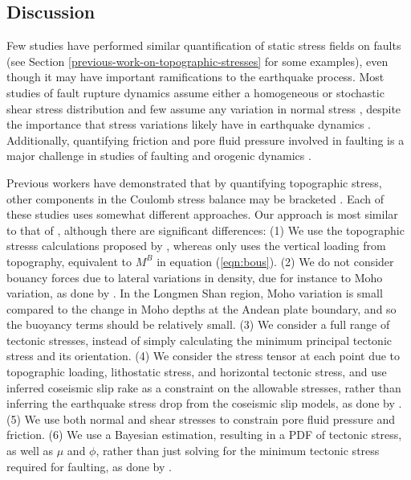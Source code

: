 \documentclass[twocolumn,jgrga]{AGUTeX}
\begin{document}
\begin{article}
\section{Discussion}\label{discussion}

Few studies have performed similar quantification of static stress
fields on faults (see Section
\ref{previous-work-on-topographic-stresses} for some examples), even
though it may have important ramifications to the earthquake process.
Most studies of fault rupture dynamics
assume either a homogeneous or stochastic shear stress distribution
\citep[e.g.,][]{oglesbyday2002} and few assume any variation in normal
stress \citep[e.g.,][]{aagaard2001}, despite the importance that stress
variations likely have in earthquake dynamics \citep[e.g.,][]{day1982,
olsen1997}. Additionally, quantifying friction and pore fluid
pressure involved in faulting is a major challenge in studies of
faulting and orogenic dynamics \citep[e.g.,][]{meissner1982,
oglesbyday2002}.

Previous workers have demonstrated that by quantifying topographic
stress, other components in the Coulomb stress balance may be bracketed
\citep[e.g.,][]{cattin1997, lamb2006, luttrell2011}. Each of these studies
uses somewhat different approaches. Our approach is most similar to that
of \citet{luttrell2011}, although there are significant
differences: (1) We use the topographic stresss calculations proposed by
\citet{liuzoback1992}, whereas 
\citet{luttrell2011} only uses the vertical loading from topography,
equivalent to $M^B$ in equation (\ref{eqn:bous}). (2) We do not consider
bouancy forces due to lateral variations in density, due for instance to
Moho variation, as done by \citet{luttrell2011}. In the
Longmen Shan region, Moho variation is small compared to the change in
Moho depths at the Andean plate boundary, and so the buoyancy terms
should be relatively small. (3) We consider a full range of tectonic
stresses, instead of simply calculating the minimum principal tectonic
stress and its orientation. (4) We consider the stress tensor at each
point due to topographic loading, lithostatic stress, and horizontal
tectonic stress, and use inferred coseismic slip rake as a constraint on
the allowable stresses, rather than inferring the earthquake stress drop
from the coseismic slip models, as done by 
\citet{luttrell2011}. (5) We use both normal and shear stresses to
constrain pore fluid pressure and friction. (6) We use a Bayesian
estimation, resulting in a PDF of tectonic stress, as well as $\mu$ and
$\phi$, rather than just solving for the minimum tectonic stress
required for faulting, as done by \citet{luttrell2011}.


\end{article}
\end{document}
